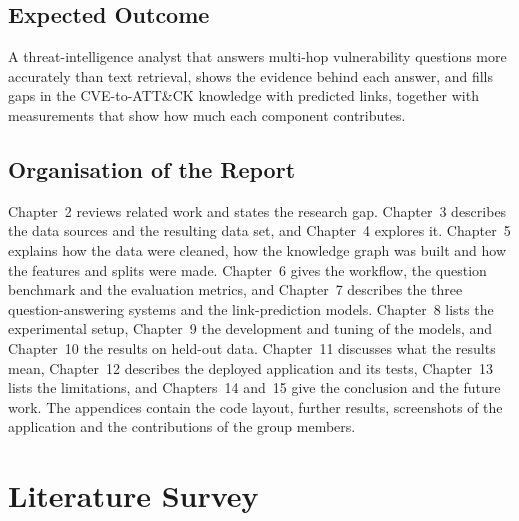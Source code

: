 \documentclass[12pt, a4paper]{article}
\newcommand{\ATTCK}{ATT\&CK}
\begin{document}
\subsection{Expected Outcome}
A threat-intelligence analyst that answers multi-hop vulnerability questions more accurately than text retrieval, shows the evidence behind each answer, and fills gaps in the CVE-to-\ATTCK{} knowledge with predicted links, together with measurements that show how much each component contributes.

\subsection{Organisation of the Report}
Chapter~2 reviews related work and states the research gap. Chapter~3 describes the data sources and the resulting data set, and Chapter~4 explores it. Chapter~5 explains how the data were cleaned, how the knowledge graph was built and how the features and splits were made. Chapter~6 gives the workflow, the question benchmark and the evaluation metrics, and Chapter~7 describes the three question-answering systems and the link-prediction models. Chapter~8 lists the experimental setup, Chapter~9 the development and tuning of the models, and Chapter~10 the results on held-out data. Chapter~11 discusses what the results mean, Chapter~12 describes the deployed application and its tests, Chapter~13 lists the limitations, and Chapters~14 and~15 give the conclusion and the future work. The appendices contain the code layout, further results, screenshots of the application and the contributions of the group members.

\section{Literature Survey}\label{sec:lit}
\end{document}
